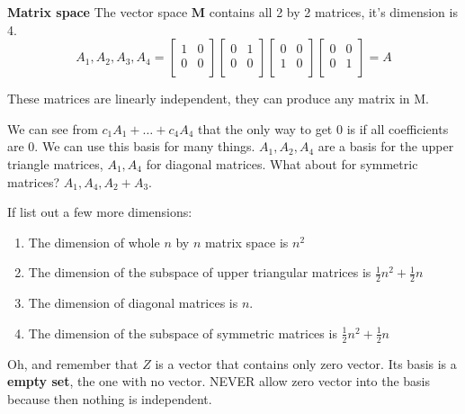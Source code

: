 \textbf{Matrix space} The vector space \(\mathbf{M} \) contains all 2 by 2 matrices, it's dimension is 4. 
\[
    A_1, A_2, A_3, A_4 = 
    \begin{bmatrix}
        1 & 0  \\
        0 & 0  \\
    \end{bmatrix}
    \begin{bmatrix}
        0 & 1  \\
        0 & 0  \\
    \end{bmatrix}
    \begin{bmatrix}
        0 & 0  \\
        1 & 0  \\
    \end{bmatrix}
    \begin{bmatrix}
        0 & 0  \\
        0 & 1  \\
    \end{bmatrix}
    = A
\]

These matrices are linearly independent,  they can produce any matrix in M. 

We can see from \(c_{1}A_1 + \ldots + c_{4}A_4\) that the only way to get 0 is if all coefficients are 0. We can use this basis for many things. \(A_1, A_2, A_4\) are a basis for the upper triangle matrices, \(A_1, A_4\) for diagonal matrices. What about for symmetric matrices? \(A_1, A_4, A_2 + A_3\). 

If list out a few more dimensions:
\begin{enumerate}
    \item The dimension of whole \(n\) by \(n\) matrix space is \(n^2\)
    \item The dimension of the subspace of upper triangular matrices is \(\frac{1}{2}n^2 + \frac{1}{2}n\) 
    \item The dimension of diagonal matrices is \(n\). 
    \item The dimension of the subspace of symmetric matrices is \(\frac{1}{2}n^2 + \frac{1}{2}n\)    
\end{enumerate}

Oh, and remember that \(Z\) is a vector that contains only zero vector. Its basis is a \textbf{empty set}, the one with no vector. NEVER allow zero vector into the basis because then nothing is independent. 

